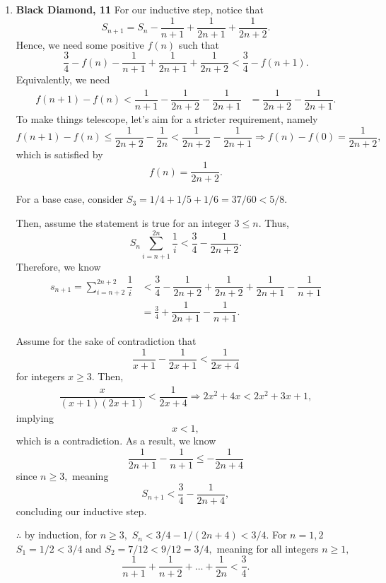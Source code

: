\documentclass[12pt]{article}
\begin{document}
\begin{enumerate}
  \item \textbf{Black Diamond, 11} For our inductive step, notice
    that $$S_{n + 1} = S_n - \dfrac{1}{n + 1} + \dfrac{1}{2n + 1} +
    \dfrac{1}{2n + 2}.$$ Hence, we need some positive $f(n)$ such that
    $$
    \frac{3}{4} - f(n) - \dfrac{1}{n + 1} + \dfrac{1}{2n + 1} +
    \dfrac{1}{2n + 2}  < \dfrac{3}{4} - f(n+ 1).
    $$
    Equivalently, we need
    \begin{align*}
      f(n + 1) - f(n) < \dfrac{1}{n + 1} - \dfrac{1}{2n + 2} -
      \dfrac{1}{2n + 1}  &= \dfrac{1}{2n + 2} - \dfrac{1}{2n + 1}.
    \end{align*}
    To make things telescope, let's aim for a stricter requirement, namely
    $$
    f(n + 1) - f(n) \leq \dfrac{1}{2n + 2} - \dfrac{1}{2n} <
    \dfrac{1}{2n + 2} - \dfrac{1}{2n + 1} \Rightarrow f(n) - f(0) =
    \dfrac{1}{2n + 2},
    $$
    which is satisfied by
    $$
    f(n) = \dfrac{1}{2n + 2}.
    $$

    For a base case, consider $S_3 = 1/4 + 1/5 + 1/6 = 37/60 < 5/8.$

    Then, assume the statement is true for an integer $3 \leq n.$ Thus,
    $$
    S_n \sum_{i = n+1}^{2n} \dfrac{1}{i} < \dfrac{3}{4} - \dfrac{1}{2n + 2}.
    $$
    Therefore, we know
    \begin{align*}
      s_{n + 1} = \sum_{i = n + 2}^{2n + 2} \dfrac{1}{i} &<
      \dfrac{3}{4} - \dfrac{1}{2n + 2} + \dfrac{1}{2n + 2} +
      \dfrac{1}{2n + 1} - \dfrac{1}{n + 1} \\
      &= \frac{3}{4} + \dfrac{1}{2n + 1} - \dfrac{1}{n + 1}.
    \end{align*}

    Assume for the sake of contradiction that
    $$
    \dfrac{1}{x + 1} - \dfrac{1}{2x + 1} < \dfrac{1}{2x + 4}
    $$
    for integers $x \geq 3.$ Then,
    \begin{align*}
      \dfrac{x}{(x+1)(2x+1)} < \dfrac{1}{2x + 4} \Rightarrow 2x^2 +
      4x < 2x^2 + 3x + 1,
    \end{align*}
    implying $$
    x < 1,
    $$
    which is a contradiction. As a result, we know $$
    \dfrac{1}{2n + 1} - \dfrac{1}{n + 1} \leq - \dfrac{1}{2n + 4}
    $$ since $n \geq 3,$
    meaning $$
    S_{n + 1} < \frac{3}{4} - \dfrac{1}{2n + 4},
    $$
    concluding our inductive step.

    $\therefore$ by induction, for $n \geq 3,$ $S_n < 3/4 - 1/(2n +
    4) < 3/4.$ For $n = 1, 2$ $S_1 = 1/2 < 3/4$ and $S_2 = 7/12 <
    9/12 = 3/4,$ meaning for all integers $n \geq 1,$
    $$
    \dfrac{1}{n + 1} + \dfrac{1}{n + 2} + \ldots + \dfrac{1}{2n} < \dfrac{3}{4}.
    $$


\end{enumerate}
\end{document}

